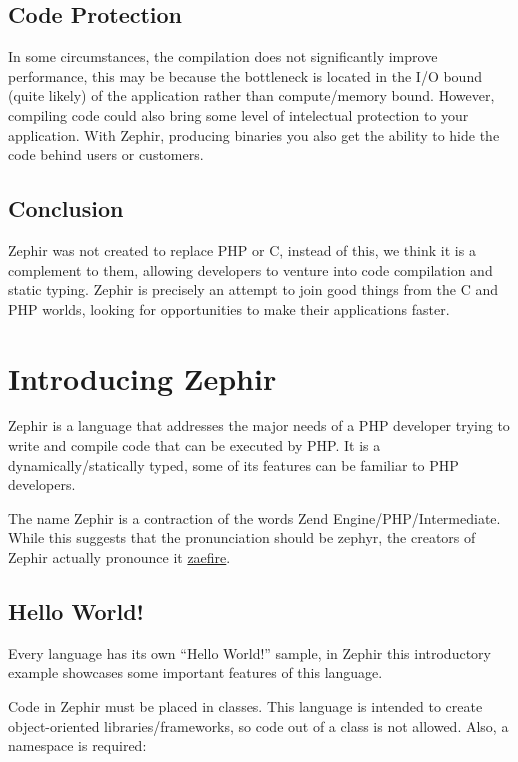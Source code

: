 \documentclass[letterpaper,10pt,english]{sphinxmanual}
\begin{document}
\subsection{Code Protection}
\label{motivation:code-protection}
In some circumstances, the compilation does not significantly improve performance, this may be because the bottleneck is located
in the I/O bound (quite likely) of the application rather than compute/memory bound.
However, compiling code could also bring some level of intelectual protection to your application.
With Zephir, producing binaries you also get the ability to hide the code behind users or customers.


\subsection{Conclusion}
\label{motivation:conclusion}
Zephir was not created to replace PHP or C, instead of this, we think it is a complement to them,
allowing developers to venture into code compilation and static typing.
Zephir is precisely an attempt to join good things from the C and PHP worlds,
looking for opportunities to make their applications faster.


\section{Introducing Zephir}
\label{intro::doc}\label{intro:introducing-zephir}
Zephir is a language that addresses the major needs of a PHP developer trying to write and compile code that
can be executed by PHP. It is a dynamically/statically typed, some of its features can be familiar to
PHP developers.

The name Zephir is a contraction of the words Zend Engine/PHP/Intermediate. While this suggests that the
pronunciation should be zephyr, the creators of Zephir actually pronounce it \href{http://translate.google.com/\#en/en/zaefire}{zaefire}.


\subsection{Hello World!}
\label{intro:hello-world}
Every language has its own ``Hello World!'' sample, in Zephir this introductory example showcases some important
features of this language.

Code in Zephir must be placed in classes. This language is intended to create object-oriented libraries/frameworks,
so code out of a class is not allowed. Also, a namespace is required:
\end{document}
